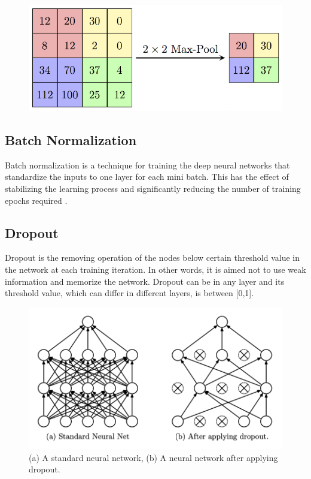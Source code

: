 \begin{figure}[h]
    \centering
    \includegraphics[width=.8\linewidth]{fig/MaxpoolSample.png}
    \label{fig:maxpooling}
\end{figure}

\subsection{Batch Normalization}

Batch normalization is a technique for training the deep neural networks that standardize the inputs to one layer for each mini batch. This has the effect of stabilizing the learning process and significantly reducing the number of training epochs required \cite{A_novelCNNModel}.

\subsection{Dropout}

Dropout is the removing operation of the nodes below certain threshold value in the network at each training iteration. In other words, it is aimed not to use weak information and memorize the network. Dropout can be in any layer and its threshold value, which can differ in different layers,  is between [0,1].

\begin{figure}[h]
    \centering
    \includegraphics[width=.8\linewidth]{fig/dropout.png}
    \caption{(a) A standard neural network, (b) A neural network after applying dropout\cite{dropout_article}.}
    \label{fig:dropout}
\end{figure}

